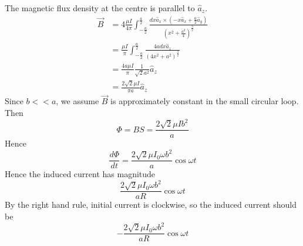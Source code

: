\documentclass[answers]{exam}
\begin{document}
\begin{questions}
\begin{solution}
    The magnetic flux density at the centre is parallel to $\hat a_z$.
    \begin{align*}
        \vec B &= 4\frac{\mu I}{4\pi} \int_{-\frac{a}{2}}^{\frac{a}{2}} \frac{dx\hat a_x \times \left(-x\hat a_x + \frac{a}{2} \hat a_y\right)}{\left(x^2 + \frac{a^2}{4}\right)^{\frac{3}{2}}} \\
               &= \frac{\mu I}{\pi} \int_{-\frac{a}{2}}^{\frac{a}{2}} \frac{4adx\hat a_z}{(4x^2+a^2)^{\frac{3}{2}}} \\
               &= \frac{4a\mu I}{\pi} \frac{1}{\sqrt{2}a^2} \hat a_z \\
               &= \frac{2\sqrt{2}\mu I}{\pi a} \hat a_z
    \end{align*}
    Since $b<<a$, we assume $\vec B$ is approximately constant in the small circular loop. Then
    $$\Phi = BS = \frac{2\sqrt{2}\mu Ib^2}{a}$$
    Hence
    $$\frac{d\Phi}{dt} = \frac{2\sqrt{2}\mu I_0\omega b^2}{a} \cos\omega t$$
    Hence the induced current has magnitude
    $$\frac{2\sqrt{2}\mu I_0\omega b^2}{aR} \cos\omega t$$
    By the right hand rule, initial current is clockwise, so the induced current should be
    $$-\frac{2\sqrt{2}\mu I_0\omega b^2}{aR} \cos\omega t$$
\end{solution}



\end{questions}
\end{document}
